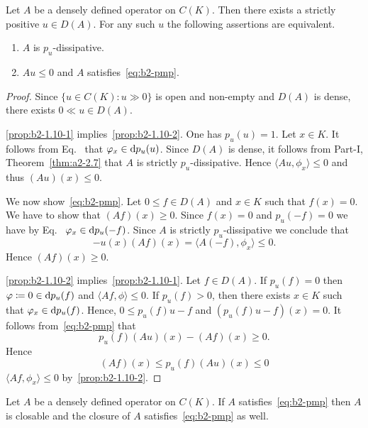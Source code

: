 \begin{proposition}\label{prop:b2-1.10}
%
Let $A$ be a densely defined operator on $C(K)$.
Then there exists a strictly positive $u \in D(A)$.
For any such $u$ the following assertions are equivalent.
\begin{enumerate}[\upshape (a)]
\item  \label{prop:b2-1.10-1}
$A$ is $p_{u}$-dissipative.

\item  \label{prop:b2-1.10-2}
$Au \leq 0$ and $A$ satisfies~\eqref{eq:b2-pmp}.
\end{enumerate}
\end{proposition}
\begin{proof}
Since $\{u \in C(K) \colon u \gg 0\}$ is open and non-empty and $D(A)$ is dense, there exists $0 \ll u \in D(A)$.

\ref{prop:b2-1.10-1} implies~\ref{prop:b2-1.10-2}.
One has $p_{u}(u) = 1$.
Let $x \in K$.
It follows from Eq.~ that $\phi_{x} \in \ddp_{u}(u)$.
Since $D(A)$ is dense, it follows from Part-I, Theorem~\ref{thm:a2-2.7}
that $A$ is strictly $p_{u}$-dissipative.
Hence $\langle Au,\phi_{x} \rangle \leq 0$ and thus $(Au)(x) \leq 0$.

We now show~\eqref{eq:b2-pmp}.
Let $0 \leq f \in D(A)$ and $x \in K$ such that $f(x) = 0$.
We have to show that $(Af)(x) \geq 0$.
Since $f(x) = 0$ and $p_{u}(-f) = 0$ we have by Eq.~  $\phi_{x} \in \ddp_{u}(-f)$.
Since $A$ is strictly $p_{u}$-dissipative we conclude that 
%
\[
	-u(x)(Af)(x) = \langle A(-f),\phi_{x} \rangle \leq 0.
\]
%
Hence $(Af)(x) \geq 0$.

\ref{prop:b2-1.10-2} implies~\ref{prop:b2-1.10-1}.
Let $f \in D(A)$.
If\/ $p_{u}(f) = 0$ then $\phi \coloneq 0 \in \ddp_{u}(f)$ and $\langle Af,\phi \rangle \leq 0$.
If\/ $p_{u}(f) > 0$, then there exists $x \in K$ such that $\phi_{x} \in \ddp_{u}(f)$.
Hence, $0 \leq p_{u}(f)u - f$ and $(p_{u}(f)u - f)(x) = 0$.
It follows from~\eqref{eq:b2-pmp} that 
%
\[
	p_{u}(f)(Au)(x) - (Af)(x) \geq 0 .
\]
%
Hence 
%
\[
	 (Af)(x) \leq p_{u}(f)(Au)(x) \leq 0 
\]
%
\ie  $\langle Af,\phi_{x} \rangle \leq 0$ 
by~\ref{prop:b2-1.10-2}.
\end{proof}
\begin{corollary}\label{cor:b2-1.11}
Let $A$ be a densely defined operator on $C(K)$.
If\/ $A$ satisfies~\eqref{eq:b2-pmp} then $A$ is closable and the closure of\/ $A$ satisfies~\eqref{eq:b2-pmp} as well.
\end{corollary}
